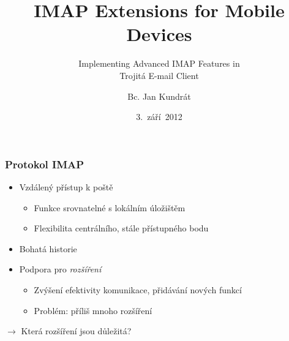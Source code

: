 \documentclass{beamer}
\begin{document}
\title{IMAP Extensions for Mobile Devices}
\subtitle{Implementing Advanced IMAP Features in \\ Trojitá E-mail Client}
\author{Bc. Jan Kundrát}
\date{3.~září~2012}

\begin{frame}
\maketitle
\end{frame}

\begin{frame}[fragile]
  \frametitle{Protokol IMAP}
  \begin{itemize}
    \item Vzdálený přístup k poště
      \begin{itemize}
        \item Funkce srovnatelné s lokálním úložištěm
        \item Flexibilita centrálního, stále přístupného bodu
      \end{itemize}
    \item Bohatá historie
    \item Podpora pro {\em rozšíření}
      \begin{itemize}
        \item Zvýšení efektivity komunikace, přidávání nových funkcí
        \item Problém: příliš mnoho rozšíření
      \end{itemize}
  \end{itemize}

   {
  \begin{center}
  \vspace{4mm}
  $\rightarrow$ \alert{Která rozšíření jsou důležitá?}
  \end{center}}
\end{frame}
\end{document}
